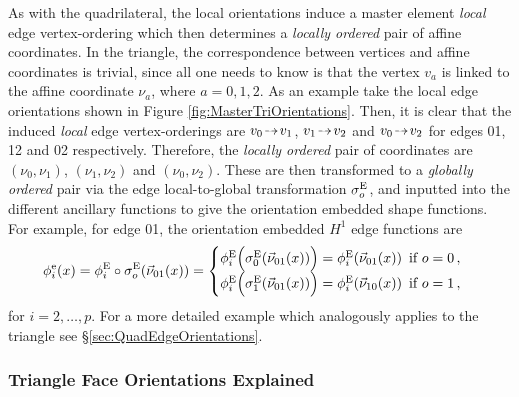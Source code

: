 As with the quadrilateral, the local orientations induce a master element \textit{local} edge vertex-ordering which then determines a \textit{locally ordered} pair of affine coordinates. 
In the triangle, the correspondence between vertices and affine coordinates is trivial, since all one needs to know is that the vertex $v_a$ is linked to the affine coordinate $\nu_a$, where $a=0,1,2$.
As an example take the local edge orientations shown in Figure \ref{fig:MasterTriOrientations}.
Then, it is clear that the induced \textit{local} edge vertex-orderings are $v_0\tdashto v_1$, $v_1\tdashto v_2$ and $v_0\tdashto v_2$ for edges 01, 12 and 02 respectively.
Therefore, the \textit{locally ordered} pair of coordinates are $(\nu_0,\nu_1)$, $(\nu_1,\nu_2)$ and $(\nu_0,\nu_2)$.
These are then transformed to a \textit{globally ordered} pair via the edge local-to-global transformation $\sigma_o^{\mathrm{E}}$, and inputted into the different ancillary functions to give the orientation embedded shape functions.
For example, for edge 01, the orientation embedded $H^1$ edge functions are
\begin{equation*}
    \phi_i^\mathrm{e}(x)=\phi_i^{\mathrm{E}}\circ\sigma_o^{\mathrm{E}}(\vec{\nu}_{01}(x))
        =\begin{cases}
            \phi_i^{\mathrm{E}}\Big(\sigma_0^{\mathrm{E}}(\vec{\nu}_{01}(x))\Big)
            	=\phi_i^{\mathrm{E}}(\vec{\nu}_{01}(x))\,\,\,\text{if }o=0\,,\\
            \phi_i^{\mathrm{E}}\Big(\sigma_1^{\mathrm{E}}(\vec{\nu}_{01}(x))\Big)
            	=\phi_i^{\mathrm{E}}(\vec{\nu}_{10}(x))\,\,\,\text{if }o=1\,,
        \end{cases}
\end{equation*}
for $i=2,\ldots,p$.
For a more detailed example which analogously applies to the triangle see \S\ref{sec:QuadEdgeOrientations}.

\subsubsection{Triangle Face Orientations Explained}
\label{sec:TriaFaceOrientations}



